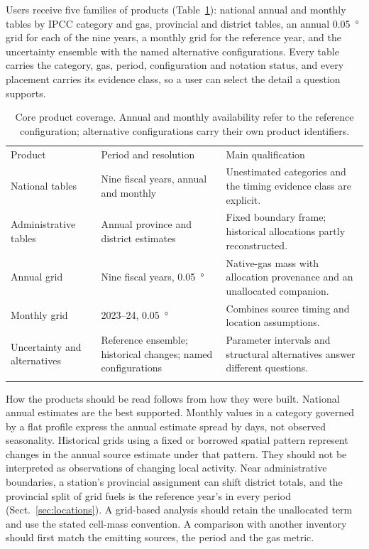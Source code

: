 \documentclass[essd,manuscript]{copernicus}
\begin{document}
Users receive five families of products (Table~\ref{tab:products}): national annual and monthly tables by IPCC category and gas, provincial and district tables, an annual \SI{0.05}{\degree} grid for each of the nine years, a monthly grid for the reference year, and the uncertainty ensemble with the named alternative configurations. Every table carries the category, gas, period, configuration and notation status, and every placement carries its evidence class, so a user can select the detail a question supports.

\begin{table}[t]
\caption{Core product coverage. Annual and monthly availability refer to the reference configuration; alternative configurations carry their own product identifiers.}
\label{tab:products}
\small
\begin{tabular}{p{}p{}p{}}
\tophline
Product & Period and resolution & Main qualification \\
\middlehline
National tables & Nine fiscal years, annual and monthly & Unestimated categories and the timing evidence class are explicit. \\
Administrative tables & Annual province and district estimates & Fixed boundary frame; historical allocations partly reconstructed. \\
Annual grid & Nine fiscal years, \SI{0.05}{\degree} & Native-gas mass with allocation provenance and an unallocated companion. \\
Monthly grid & 2023--24, \SI{0.05}{\degree} & Combines source timing and location assumptions. \\
Uncertainty and alternatives & Reference ensemble; historical changes; named configurations & Parameter intervals and structural alternatives answer different questions. \\
\bottomhline
\end{tabular}
\end{table}

How the products should be read follows from how they were built. National annual estimates are the best supported. Monthly values in a category governed by a flat profile express the annual estimate spread by days, not observed seasonality. Historical grids using a fixed or borrowed spatial pattern represent changes in the annual source estimate under that pattern. They should not be interpreted as observations of changing local activity. Near administrative boundaries, a station's provincial assignment can shift district totals, and the provincial split of grid fuels is the reference year's in every period (Sect.~\ref{sec:locations}). A grid-based analysis should retain the unallocated term and use the stated cell-mass convention. A comparison with another inventory should first match the emitting sources, the period and the gas metric.
\end{document}
